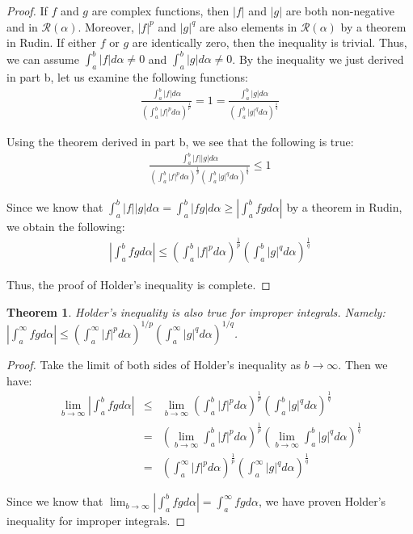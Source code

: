 \documentclass[psamsfonts]{amsart}
\newtheorem{thm}{Theorem}[section]
\theoremstyle{definition}
\theoremstyle{remark}
\numberwithin{equation}{section}
\begin{document}
\begin{proof}
If $f$ and $g$ are complex functions, then $|f|$ and $|g|$ are both non-negative and in $\mathscr{R}(\alpha)$. Moreover, $|f|^p$ and $|g|^q$ are also elements in $\mathscr{R}(\alpha)$ by a theorem in Rudin. If either $f$ or $g$ are identically zero, then the inequality is trivial. Thus, we can assume $\int_a^b |f| d \alpha \neq 0$ and $\int_a^b |g| d \alpha \neq 0$. By the inequality we just derived in part b, let us examine the following functions:
\begin{eqnarray}
\frac{ \int_a^b |f| d \alpha}{ \left( \int_a^b |f|^p d \alpha \right)^{\frac{1}{p}}} = 1 = \frac{ \int_a^b |g| d \alpha }{ \left( \int_a^b |g|^q d \alpha \right)^{\frac{1}{q}} }
\end{eqnarray}

Using the theorem derived in part b, we see that the following is true:
\begin{eqnarray}
\frac{\int_a^b |f| |g| d \alpha}{\left( \int_a^b |f|^p d \alpha \right)^{\frac{1}{p}}\left( \int_a^b |g|^q d \alpha \right)^{\frac{1}{q}}} \leq 1
\end{eqnarray}

Since we know that $\int_a^b|f||g| d \alpha = \int_a^b |fg| d \alpha \geq | \int_a^b f g d \alpha |$ by a theorem in Rudin, we obtain the following:
\begin{eqnarray}
\left| \int_a^b f g d \alpha \right| \leq \left( \int_a^b |f|^p d \alpha \right)^{\frac{1}{p}}\left( \int_a^b |g|^q d \alpha \right)^{\frac{1}{q}}
\end{eqnarray}

Thus, the proof of Holder's inequality is complete. 
\end{proof}

\begin{thm}
Holder's inequality is also true for improper integrals. Namely: $|\int_a^\infty f g d \alpha | \leq ( \int_a^\infty |f|^p d \alpha )^{1/p} (\int_a^\infty |g|^q d \alpha)^{1/q}$. 
\end{thm}

\begin{proof}
Take the limit of both sides of Holder's inequality as $b \to \infty$. Then we have:
\begin{eqnarray}
\lim_{b \to \infty} \left| \int_a^b f g d \alpha \right| &\leq& \lim_{b \to \infty} \left( \int_a^b |f|^p d \alpha \right)^{\frac{1}{p}}\left( \int_a^b |g|^q d \alpha \right)^{\frac{1}{q}} \\
&=& \left(\lim_{b \to \infty} \int_a^b |f|^p d \alpha \right)^{\frac{1}{p}}\left( \lim_{b \to \infty}\int_a^b |g|^q d \alpha \right)^{\frac{1}{q}} \\
&=& \left( \int_a^\infty |f|^p d \alpha \right)^{\frac{1}{p}}\left( \int_a^\infty |g|^q d \alpha \right)^{\frac{1}{q}}
\end{eqnarray}

Since we know that $\lim_{b \to \infty} | \int_a^b f g d \alpha | = \int_a^\infty f g d \alpha$, we have proven Holder's inequality for improper integrals.
\end{proof}
\end{document}
